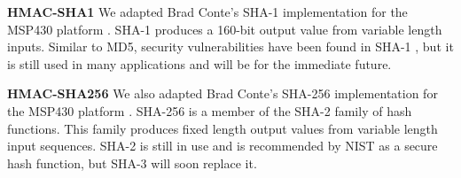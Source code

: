 
\textbf{HMAC-SHA1}
We adapted Brad Conte's SHA-1 implementation for the MSP430 platform \cite{Conte-SHA1}. SHA-1 produces a 160-bit output value from variable length inputs. Similar to MD5, security vulnerabilities have been found in SHA-1 \cite{Wang-SHA1}, but it is still used in many applications and will be for the immediate future\cite{FIPS-180-4}.

\textbf{HMAC-SHA256}
We also adapted Brad Conte's SHA-256 implementation for the MSP430 platform \cite{Conte-SHA256}. SHA-256 is a member of the SHA-2 family of hash functions. This family produces fixed length output values from variable length input sequences. SHA-2 is still in use and is recommended by NIST as a secure hash function, but SHA-3 will soon replace it\cite{FIPS-180-4}.